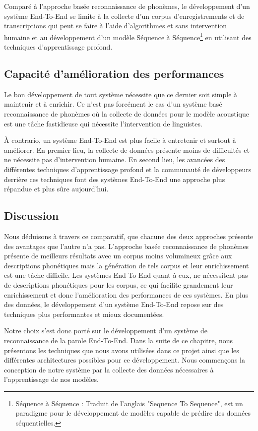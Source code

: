 Comparé à l'approche basée reconnaissance de phonèmes, le développement d'un système End-To-End se limite à la collecte d'un corpus d'enregistrements et de transcriptions qui peut se faire à l'aide d'algorithmes et sans intervention humaine et au développement d'un modèle Séquence à Séquence\footnote{Séquence à Séquence : Traduit de l'anglais "Sequence To Sequence", est un paradigme pour le développement de modèles capable de prédire des données séquentielles.} en utilisant des techniques d'apprentissage profond.

\subsection{Capacité d'amélioration des performances}
Le bon développement de tout système nécessite que ce dernier soit simple à maintenir et à enrichir. Ce n'est pas forcément le cas d'un système basé reconnaissance de phonèmes où la collecte de données pour le modèle acoustique est une tâche fastidieuse qui nécessite l'intervention de linguistes.

À contrario, un système End-To-End est plus facile à entretenir et surtout à améliorer. En premier lieu, la collecte de données présente moins de difficultés et ne nécessite pas d'intervention humaine. En second lieu, les avancées des différentes techniques d'apprentissage profond et la communauté de développeurs derrière ces techniques font des systèmes End-To-End une approche plus répandue et plus sûre aujourd'hui.

\subsection{Discussion}
Nous déduisons à travers ce comparatif, que chacune des deux approches présente des avantages que l'autre n'a pas. L'approche basée reconnaissance de phonèmes présente de meilleurs résultats avec un corpus moins volumineux grâce aux descriptions phonétiques mais la génération de tels corpus et leur enrichissement est une tâche difficile.
Les systèmes End-To-End quant à eux, ne nécessitent pas de descriptions phonétiques pour les corpus, ce qui facilite grandement leur enrichissement et donc l'amélioration des performances de ces systèmes. En plus des données, le développement d'un système End-To-End repose sur des techniques plus performantes et mieux documentées.

Notre choix s'est donc porté sur le développement d'un système de reconnaissance de la parole End-To-End. Dans la suite de ce chapitre, nous présentons les techniques que nous avons utilisées dans ce projet ainsi que les différentes architectures possibles pour ce développement. Nous commençons la conception de notre système par la collecte des données nécessaires à l'apprentissage de nos modèles.


